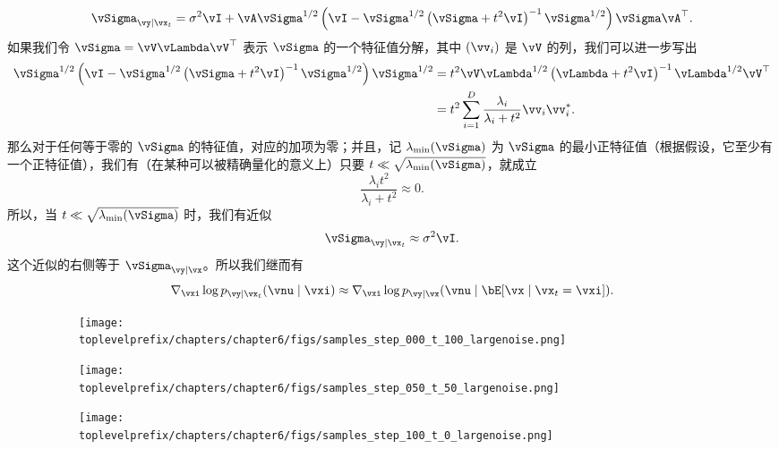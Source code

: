 \documentclass[../../book-main_zh.tex]{subfiles}
\begin{document}
\begin{example}
  \begin{equation}
    \vSigma_{\vy \mid \vx_t}
    =
    \sigma^2 \vI + \vA\vSigma^{1/2} \left(
      \vI - \vSigma^{1/2}\left(
      \vSigma + t^2 \vI
      \right)^{-1}
      \vSigma^{1/2}
    \right)\vSigma\vA^\top.
  \end{equation}
  如果我们令 $\vSigma = \vV \vLambda \vV^\top$ 表示 $\vSigma$ 的一个特征值分解，其中 $(\vv_i)$ 是 $\vV$ 的列，我们可以进一步写出
  \begin{align}
    \vSigma^{1/2}\left(
    \vI - \vSigma^{1/2}\left(
    \vSigma + t^2 \vI
    \right)^{-1}
    \vSigma^{1/2}
    \right) \vSigma^{1/2}
    &=
    t^2 \vV \vLambda^{1/2}\left(
      \vLambda + t^2 \vI
    \right)^{-1}
    \vLambda^{1/2}
    \vV^\top
    \\
    &=
    t^2 \sum_{i=1}^D
    \frac{\lambda_i}{\lambda_i + t^2}
    \vv_i \vv_i\adj.
  \end{align}
  那么对于任何等于零的 $\vSigma$ 的特征值，对应的加项为零；并且，记 $\lambda_{\min}(\vSigma)$ 为 $\vSigma$ 的最小正特征值（根据假设，它至少有一个正特征值），我们有（在某种可以被精确量化的意义上）只要 $t \ll \sqrt{\lambda_{\min}(\vSigma)}$，就成立
  \begin{equation}
    \frac{\lambda_i t^2}{\lambda_i + t^2} \approx 0.
  \end{equation}
  所以，当 $t \ll \sqrt{\lambda_{\min}(\vSigma)}$ 时，我们有近似
  \begin{equation}
    \vSigma_{\vy \mid \vx_t} \approx \sigma^2 \vI.
  \end{equation}
  这个近似的右侧等于 $\vSigma_{\vy \mid \vx}$。所以我们继而有
  \begin{equation}
    \nabla_{\vxi} \log p_{\vy \mid \vx_t}(\vnu \mid \vxi)
    \approx
    \nabla_{\vxi} \log p_{\vy \mid \vx}(\vnu \mid \bE[\vx \mid \vx_t = \vxi]).
    \label{eq:conditional-posterior-measurementmatching-gaussian-case-dps-approx}
  \end{equation}

  \begin{figure}[tbp]
    \centering
    \begin{subfigure}{0.32\textwidth}
      \texttt{[image: \\toplevelprefix/chapters/chapter6/figs/samples\_step\_000\_t\_100\_largenoise.png]}
    \end{subfigure}
    \hfill
    \begin{subfigure}{0.32\textwidth}
      \texttt{[image: \\toplevelprefix/chapters/chapter6/figs/samples\_step\_050\_t\_50\_largenoise.png]}
    \end{subfigure}
    \hfill
    \begin{subfigure}{0.32\textwidth}
      \texttt{[image: \\toplevelprefix/chapters/chapter6/figs/samples\_step\_100\_t\_0\_largenoise.png]}
    \end{subfigure}


\end{figure}
\end{example}
\end{document}
